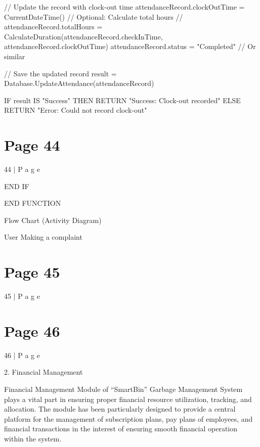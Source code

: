 \documentclass{article}
\begin{document}
    // Update the record with clock-out time 
    attendanceRecord.clockOutTime = CurrentDateTime() 
    // Optional: Calculate total hours 
    // attendanceRecord.totalHours = CalculateDuration(attendanceRecord.checkInTime, 
attendanceRecord.clockOutTime) 
    attendanceRecord.status = "Completed" // Or similar 
 
    // Save the updated record 
    result = Database.UpdateAttendance(attendanceRecord) 
 
    IF result IS "Success" THEN 
        RETURN "Success: Clock-out recorded" 
    ELSE 
        RETURN "Error: Could not record clock-out" 

\section*{Page 44}
44 | P a g e 
 
    END IF 
 
END FUNCTION 
 
Flow Chart (Activity Diagram) 
 
User Making a complaint 
 
 
 
 
 
 
 
 

\section*{Page 45}
45 | P a g e 
 
 
 
 
 
 
 
 
 
 
 
 
 
 
 
 
 
 
 
 
 
 
 
 
 
 
 


\section*{Page 46}
46 | P a g e 
 
 
 
2. Financial Management 
 
Financial Management Module of “SmartBin” Garbage Management System plays a vital 
part in ensuring proper financial resource utilization, tracking, and allocation. The module 
has been particularly designed to provide a central platform for the management of 
subscription plans, pay plans of employees, and financial transactions in the interest of 
ensuring smooth financial operation within the system. 
 
\end{document}
